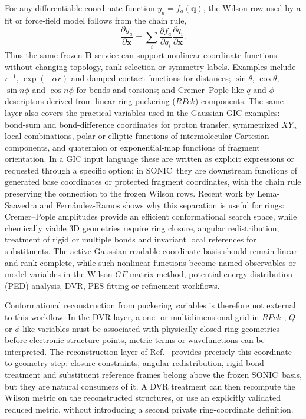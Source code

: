 \documentclass[journal=jctcce,manuscript=article,layout=traditional]{achemso}
\newcommand{\SONIC}{SONIC}
\newcommand{\Bmat}{\mathbf{B}}
\newcommand{\x}{\mathbf{x}}
\newcommand{\q}{\mathbf{q}}
\theoremstyle{definition}
\begin{document}
For any differentiable coordinate function \(y_a=f_a(\q)\), the Wilson row used
by a fit or force-field model follows from the chain rule,
\begin{equation}
  \label{eq:chain-rule}
  \frac{\partial y_a}{\partial \x}
  =
  \sum_i
  \frac{\partial f_a}{\partial q_i}
  \frac{\partial q_i}{\partial \x}.
\end{equation}
Thus the same frozen \(\Bmat\) service can support nonlinear coordinate
functions without changing topology, rank selection or symmetry labels.
Examples include \(r^{-1}\), \(\exp(-\alpha r)\) and damped contact functions
for distances; \(\sin\theta\), \(\cos\theta\), \(\sin n\phi\) and
\(\cos n\phi\) for bends and torsions; and Cremer--Pople-like \(q\) and
\(\phi\) descriptors derived from linear ring-puckering (\(RPck\)) components.
The same layer
also covers the practical variables used in the Gaussian GIC examples:
bond-sum and bond-difference coordinates for proton transfer, symmetrized
\(XY_n\) local combinations, polar or elliptic functions of intermolecular
Cartesian components, and quaternion or exponential-map functions of fragment
orientation.\cite{Marenich2025GIC}  In a GIC input language these are written
as explicit expressions or requested through a specific option; in \SONIC\ they
are downstream functions of generated base coordinates or protected fragment
coordinates, with the chain rule preserving the connection to the frozen
Wilson rows.  Recent work by
Lema-Saavedra and Fern{\'a}ndez-Ramos shows why this separation is useful for
rings: Cremer--Pople amplitudes provide an efficient conformational search
space, while chemically viable 3D geometries require ring closure, angular
redistribution, treatment of rigid or multiple bonds and invariant local
references for substituents.\cite{LemaSaavedraFernandezRamos2026RingCP}  The
active Gaussian-readable coordinate basis should remain linear and rank
complete, while such nonlinear functions become named observables or model
variables in the Wilson \(GF\) matrix method, potential-energy-distribution
(PED) analysis, DVR, PES-fitting or refinement workflows.

Conformational reconstruction from puckering variables is therefore not external
to this workflow.  In the DVR layer, a one- or multidimensional grid in
\(RPck\)-, \(Q\)- or \(\phi\)-like variables must be associated with physically
closed ring geometries before electronic-structure points, metric terms or
wavefunctions can be interpreted.  The reconstruction layer of
Ref.~ provides precisely this
coordinate-to-geometry step: closure constraints, angular redistribution,
rigid-bond treatment and substituent reference frames belong above the frozen
\SONIC\ basis, but they are natural consumers of it.  A DVR treatment can then
recompute the Wilson metric on the reconstructed structures, or use an explicitly
validated reduced metric, without introducing a second private ring-coordinate
definition.
\end{document}
